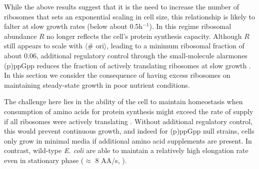 While the above results suggest that it is the need to increase the number of
ribosomes that sets an exponential scaling in cell size, this relationship is
likely to falter at slow growth rates (below about 0.5h$^{-1}$). In this regime
ribosomal abundance $R$ no longer reflects the cell's protein synthesis
capacity. Although $R$ still appears to scale with $\langle$\# ori$\rangle$,
leading to a minimum ribosomal fraction of about 0.06, additional regulatory
control through the small-molecule alarmones (p)ppGpp  reduces the fraction of
actively translating ribosomes at slow growth \citep{dai2016, bosdriesz2015,
zhu2019}. In this section we consider the consequence of having excess ribosomes
on maintaining steady-state growth in poor nutrient conditions.


The challenge here lies in the ability of the cell to maintain homeostasis when
consumption of amino acids for protein synthesis might exceed the rate of supply
if all ribosomes were actively translating .
Without additional regulatory control, this would prevent continuous growth, and
indeed for (p)ppGpp null strains, cells only grow in minimal media if additional
amino acid supplements are present. In contrast, wild-type \textit{E. coli} are
able to maintain a relatively high elongation rate even in stationary phase
($\approx$ 8 AA/s, \citep{dai2016, dai2018}).


